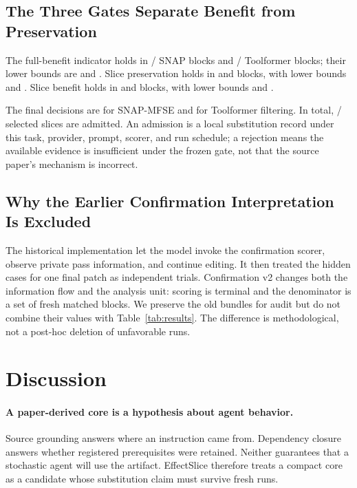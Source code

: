 \documentclass[letterpaper]{article} %
\begin{document}
\subsection{The Three Gates Separate Benefit from Preservation}

The full-benefit indicator holds in
\SnapMFSEFullBenefitSuccesses/\EffectSliceReplicatesPerTask{} SNAP blocks and
\ToolformerFilterFullBenefitSuccesses/\EffectSliceReplicatesPerTask{}
Toolformer blocks; their lower bounds are
\SnapMFSEFullBenefitCPLower{} and
\ToolformerFilterFullBenefitCPLower.  Slice preservation holds in
\SnapMFSESlicePreservationSuccesses{} and
\ToolformerFilterSlicePreservationSuccesses{} blocks, with lower bounds
\SnapMFSESlicePreservationCPLower{} and
\ToolformerFilterSlicePreservationCPLower.  Slice benefit holds in
\SnapMFSESliceBenefitSuccesses{} and
\ToolformerFilterSliceBenefitSuccesses{} blocks, with lower bounds
\SnapMFSESliceBenefitCPLower{} and
\ToolformerFilterSliceBenefitCPLower.

The final decisions are \SnapMFSEDecision{} for SNAP-MFSE and
\ToolformerFilterDecision{} for Toolformer filtering.  In total,
\EffectSliceAdmissions/\EffectSliceTaskCount{} selected slices are admitted.
An admission is a local substitution record under this task, provider, prompt,
scorer, and run schedule; a rejection means the available evidence is
insufficient under the frozen gate, not that the source paper's mechanism is
incorrect.

\subsection{Why the Earlier Confirmation Interpretation Is Excluded}

The historical implementation let the model invoke the confirmation scorer,
observe private pass information, and continue editing.  It then treated the
hidden cases for one final patch as independent trials.  Confirmation v2 changes
both the information flow and the analysis unit: scoring is terminal and the
denominator is a set of fresh matched blocks.  We preserve the old bundles for
audit but do not combine their values with Table~\ref{tab:results}.  The
difference is methodological, not a post-hoc deletion of unfavorable runs.

\section{Discussion}

\paragraph{A paper-derived core is a hypothesis about agent behavior.}
Source grounding answers where an instruction came from.  Dependency closure
answers whether registered prerequisites were retained.  Neither guarantees
that a stochastic agent will use the artifact.  EffectSlice therefore treats a
compact core as a candidate whose substitution claim must survive fresh runs.
\end{document}
